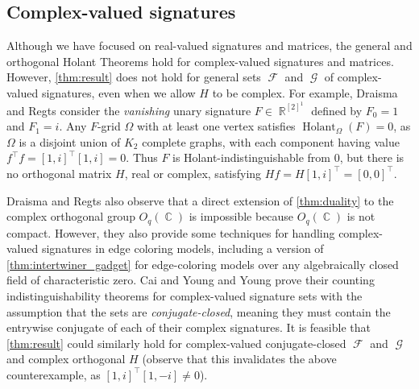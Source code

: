 \documentclass{article}
\theoremstyle{remark}
\theoremstyle{definition}
\DeclareMathOperator{\rr}{\mathbb{R}}
\DeclareMathOperator{\cc}{\mathbb{C}}
\DeclareMathOperator{\fc}{\mathcal{F}}
\DeclareMathOperator{\gc}{\mathcal{G}}
\DeclareMathOperator{\holant}{Holant}
\begin{document}
\subsection{Complex-valued signatures}
\label{sec:complex}
Although we have focused on real-valued signatures and matrices, the general and orthogonal 
Holant Theorems hold for complex-valued signatures and matrices. However,
\autoref{thm:result} does not hold for general sets $\fc$ and $\gc$ of complex-valued
signatures, even when we allow $H$ to be complex. For example, Draisma and Regts
\cite{draisma_tensor_2013} consider the \emph{vanishing} unary signature $F \in \rr^{[2]^1}$
defined by $F_0 = 1$ and $F_1 = i$. Any $F$-grid $\Omega$ with at least
one vertex satisfies $\holant_\Omega(F) = 0$, as $\Omega$ is a disjoint union of $K_2$ complete graphs,
with each component having value $f^\top f = [1,i]^\top [1,i] = 0$. 
Thus $F$ is Holant-indistinguishable from 0, but
there is no orthogonal matrix $H$, real or complex, satisfying $Hf = H [1,i]^\top = [0,0]^\top$.

Draisma and Regts also observe that a direct extension of \autoref{thm:duality} to the complex
orthogonal group $O_q(\cc)$ is impossible because $O_q(\cc)$ is not compact. However, they
also provide some techniques for handling complex-valued
signatures in edge coloring models, including a version \cite[Theorem 3]{draisma_tensor_2013} of \autoref{thm:intertwiner_gadget}
for edge-coloring models over any algebraically closed field of characteristic zero.
Cai and Young \cite{cai_planar_2023} and Young \cite{young2022equality} prove their counting
indistinguishability theorems for complex-valued signature sets with the assumption that the sets
are \emph{conjugate-closed}, meaning they must contain the entrywise conjugate of each of their
complex signatures.
It is feasible that \autoref{thm:result} could similarly hold for complex-valued conjugate-closed
$\fc$ and $\gc$ and complex orthogonal $H$ (observe that this invalidates the above counterexample,
as $[1,i]^\top [1,-i] \neq 0$).
\end{document}
